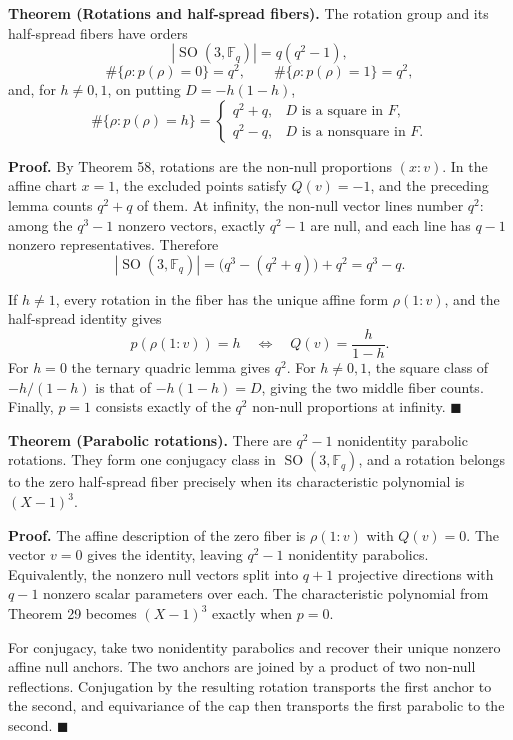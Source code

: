 \documentclass[11pt]{article}
\newcommand{\F}{\mathbb F}
\newcommand{\SO}{\operatorname{SO}}
\begin{document}
\medskip
\noindent\textbf{Theorem (Rotations and half-spread fibers).}
The rotation group and its half-spread fibers have orders
\[
 |\SO(3,\F_q)|=q(q^2-1),
\]
\[
 \#\{\rho:p(\rho)=0\}=q^2,
 \qquad
 \#\{\rho:p(\rho)=1\}=q^2,
\]
and, for \(h\ne0,1\), on putting \(D=-h(1-h)\),
\[
 \#\{\rho:p(\rho)=h\}=
 \begin{cases}
 q^2+q,&D\text{ is a square in }F,\\
 q^2-q,&D\text{ is a nonsquare in }F.
 \end{cases}
\]

\smallskip
\noindent\textbf{Proof.}
By Theorem 58, rotations are the non-null proportions \((x:v)\).  In the
affine chart \(x=1\), the excluded points satisfy \(Q(v)=-1\), and the
preceding lemma counts \(q^2+q\) of them.  At infinity, the non-null vector
lines number \(q^2\): among the \(q^3-1\) nonzero vectors, exactly \(q^2-1\)
are null, and each line has \(q-1\) nonzero representatives.  Therefore
\[
 |\SO(3,\F_q)|=\bigl(q^3-(q^2+q)\bigr)+q^2=q^3-q.
\]

If \(h\ne1\), every rotation in the fiber has the unique affine form
\(\rho(1:v)\), and the half-spread identity gives
\[
 p(\rho(1:v))=h
 \quad\Longleftrightarrow\quad
 Q(v)=\frac{h}{1-h}.
\]
For \(h=0\) the ternary quadric lemma gives \(q^2\).  For \(h\ne0,1\), the
square class of \(-h/(1-h)\) is that of \(-h(1-h)=D\), giving the two middle
fiber counts.  Finally, \(p=1\) consists exactly of the \(q^2\) non-null
proportions at infinity. \hfill\(\blacksquare\)

\medskip
\noindent\textbf{Theorem (Parabolic rotations).}
There are \(q^2-1\) nonidentity parabolic rotations.  They form one conjugacy
class in \(\SO(3,\F_q)\), and a rotation belongs to the zero half-spread
fiber precisely when its characteristic polynomial is \((X-1)^3\).

\smallskip
\noindent\textbf{Proof.}
The affine description of the zero fiber is \(\rho(1:v)\) with \(Q(v)=0\).
The vector \(v=0\) gives the identity, leaving \(q^2-1\) nonidentity
parabolics.  Equivalently, the nonzero null vectors split into \(q+1\)
projective directions with \(q-1\) nonzero scalar parameters over each.
The characteristic polynomial from Theorem 29 becomes \((X-1)^3\) exactly
when \(p=0\).

For conjugacy, take two nonidentity parabolics and recover their unique
nonzero affine null anchors.  The two anchors are joined by a product of two
non-null reflections.  Conjugation by the resulting rotation transports the
first anchor to the second, and equivariance of the cap then transports the
first parabolic to the second. \hfill\(\blacksquare\)
\end{document}
